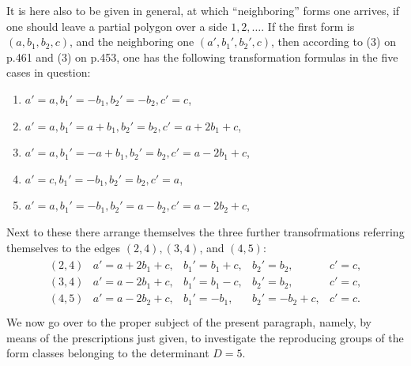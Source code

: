 It is here also to be given in general, at which “neighboring” forms one arrives, if one should leave a partial polygon over a side $1, 2, \ldots$. If the first form is $(a,b_1,b_2,c)$, and the neighboring one $(a',b_1',b_2',c)$, then according to (3) on p.461 and (3) on p.453, one has the following transformation formulas in the five cases in question:
\begin{enumerate}
    \item $a'=a, b_1'=-b_1, b_2'=-b_2, c'=c$,
    \item $a'=a, b_1'=a+b_1, b_2'=b_2, c'=a+2b_1+c$,
    \item $a'=a, b_1'=-a+b_1, b_2'=b_2, c'=a-2b_1+c$,
    \item $a'=c, b_1'=-b_1, b_2'=b_2, c'=a$,
    \item $a'=a, b_1'=-b_1, b_2'=a-b_2, c'=a-2b_2+c$,
\end{enumerate}
Next to these there arrange themselves the three further transofrmations referring themselves to the edges $(2,4), (3,4)$, and $(4,5)$:
\begin{align}
    \begin{array}{ccccc}
    (2,4) & a'=a+2b_1+c, & b_1'=b_1+c, & b_2'=b_2, & c'=c,\\
    (3,4) & a'=a-2b_1+c, & b_1'=b_1-c, & b_2'=b_2, & c'=c,\\
    (4,5) & a'=a-2b_2+c, & b_1'=-b_1, & b_2'=-b_2+c, & c'=c.\\
    \end{array}
\end{align}
We now go over to the proper subject of the present paragraph, namely, by means of the prescriptions just given, to investigate the reproducing groups of the form classes belonging to the determinant $D=5$.

